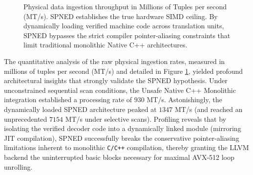 \documentclass[onecolumn]{IEEEtran}
\numberwithin{equation}{section}
\theoremstyle{definition}
\theoremstyle{remark}
\begin{document}
\begin{figure}[htbp]
    \centering
    \caption{Physical data ingestion throughput in Millions of Tuples per second (MT/s). SPNED establishes the true hardware SIMD ceiling. By dynamically loading verified machine code across translation units, SPNED bypasses the strict compiler pointer-aliasing constraints that limit traditional monolithic Native C++ architectures.}
    \label{fig:exp1_throughput}
\end{figure}

The quantitative analysis of the raw physical ingestion rates, measured in millions of tuples per second (MT/s) and detailed in Figure \ref{fig:exp1_throughput}, yielded profound architectural insights that strongly validate the SPNED hypothesis. Under unconstrained sequential scan conditions, the Unsafe Native C++ Monolithic integration established a processing rate of $930$ MT/s. Astonishingly, the dynamically loaded SPNED architecture peaked at $1347$ MT/s (and reached an unprecedented $7154$ MT/s under selective scans). Profiling reveals that by isolating the verified decoder code into a dynamically linked module (mirroring JIT compilation), SPNED successfully breaks the conservative pointer-aliasing limitations inherent to monolithic \texttt{C/C++} compilation, thereby granting the LLVM backend the uninterrupted basic blocks necessary for maximal AVX-512 loop unrolling.
\end{document}
